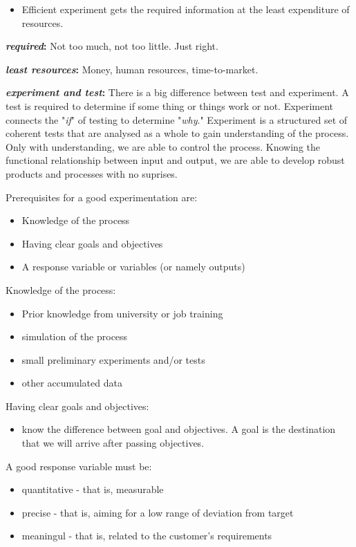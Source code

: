 \begin{itemize}
	\item Efficient experiment gets the required information at the least expenditure of resources.
\end{itemize}

\textbf{\textit{required}:} Not too much, not too little. Just right.

\textbf{\textit{least resources}:} Money, human resources, time-to-market.

\textbf{\textit{experiment and test}:} There is a big difference between test and experiment. A test is required to determine if some thing or things work or not. Experiment connects the "\textit{if}" of testing to determine "\textit{why}." Experiment is a structured set of coherent tests that are analysed as a whole to gain understanding of the process. Only with understanding, we are able to control the process. Knowing the functional relationship between input and output, we are able to develop robust products and processes with no suprises.

Prerequisites for a good experimentation are:

\begin{itemize}
	\item Knowledge of the process
	\item Having clear goals and objectives
	\item A response variable or variables (or namely outputs)
\end{itemize}

Knowledge of the process:
\begin{itemize}
	\item Prior knowledge from university or job training
	\item simulation of the process
	\item small preliminary experiments and/or tests
	\item other accumulated data
\end{itemize}

Having clear goals and objectives:
\begin{itemize}
	\item know the difference between goal and objectives. A goal is the destination that we will arrive after passing objectives.
\end{itemize}

A good response variable must be:
\begin{itemize}
	\item quantitative - that is, measurable
	\item precise - that is, aiming for a low range of deviation from target
	\item meaningul - that is, related to the customer's requirements
\end{itemize}

